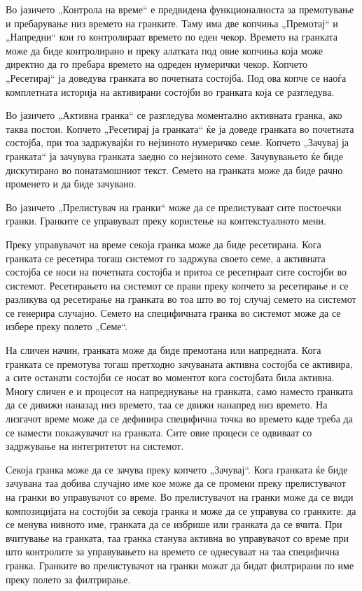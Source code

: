 Во јазичето „Контрола на време“ е предвидена функционалноста за премотување и пребарување низ времето на гранките. Таму има две копчиња „Премотај“ и „Напредни“ кои го контролираат времето по еден чекор. Времето на гранката може да биде контролирано и преку алатката под овие копчиња која може директно да го пребара времето на одреден нумерички чекор. Копчето „Ресетирај“ ја доведува гранката во почетната состојба. Под ова копче се наоѓа комплетната историја на активирани состојби во гранката која се разгледува.

Во јазичето „Активна гранка“ се разгледува моментално активната гранка, ако таква постои. Копчето „Ресетирај ја гранката“ ќе ја доведе гранката во почетната состојба, при тоа задржувајќи го нејзиното нумеричко семе. Копчето „Зачувај ја гранката“ ја зачувува гранката заедно со нејзиното семе. Зачувувањето ќе биде дискутирано во понатамошниот текст. Семето на гранката може да биде рачно променето и да биде зачувано.


Во јазичето „Прелистувач на гранки“ може да се прелистуваат сите постоечки гранки. Гранките се управуваат преку користење на контекстуалното мени.

Преку управувачот на време секоја гранка може да биде ресетирана. Кога гранката се ресетира тогаш системот го задржува своето семе, а активната состојба се носи на почетната состојба и притоа се ресетираат сите состојби во системот. Ресетирањето на системот се прави преку копчето за ресетирање и се разликува од ресетирање на гранката во тоа што во тој случај семето на системот се генерира случајно. Семето на специфичната гранка во системот може да се избере преку полето „Семе“.

На сличен начин, гранката може да биде премотана или напредната. Кога гранката се премотува тогаш претходно зачуваната активна состојба се активира, а сите останати состојби се носат во моментот кога состојбата била активна. Многу сличен е и процесот на напреднување на гранката, само наместо гранката да се дивижи наназад низ времето, таа се движи нанапред низ времето. На лизгачот време може да се дефинира специфична точка во времето каде треба да се намести покажувачот на гранката. Сите овие процеси се одвиваат со задржување на интегритетот на системот.

Секоја гранка може да се зачува преку копчето „Зачувај“. Кога гранката ќе биде зачувана таа добива случајно име кое може да се промени преку прелистувачот на гранки во управувачот со време. Во прелистувачот на гранки може да се види композицијата на состојби за секоја гранка и може да се управува со гранките: да се менува нивното име, гранката да се избрише или гранката да се вчита. При вчитување на гранката, таа гранка станува активна во управувачот со време при што контролите за управувањето на времето се однесуваат на таа специфична гранка. Гранките во прелистувачот на гранки можат да бидат филтрирани по име преку полето за филтрирање.

